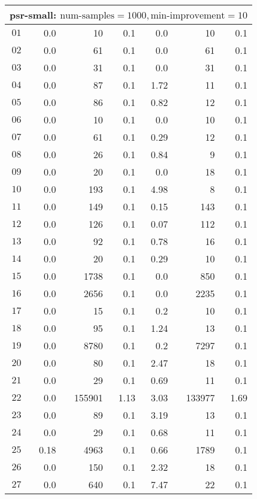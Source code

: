 \begin{longtable}{|c||r|r|r||r|r|r|}
\multicolumn{7}{|l|}{psr-small: $\text{num-samples}=1000,\text{min-improvement}=10$}\\\hline
$01$ & 0.0 & 10 & 0.1 &0.0 & 10 & 0.1 \\\hline
$02$ & 0.0 & 61 & 0.1 &0.0 & 61 & 0.1 \\\hline
$03$ & 0.0 & 31 & 0.1 &0.0 & 31 & 0.1 \\\hline
$04$ & 0.0 & 87 & 0.1 &1.72 & 11 & 0.1 \\\hline
$05$ & 0.0 & 86 & 0.1 &0.82 & 12 & 0.1 \\\hline
$06$ & 0.0 & 10 & 0.1 &0.0 & 10 & 0.1 \\\hline
$07$ & 0.0 & 61 & 0.1 &0.29 & 12 & 0.1 \\\hline
$08$ & 0.0 & 26 & 0.1 &0.84 & 9 & 0.1 \\\hline
$09$ & 0.0 & 20 & 0.1 &0.0 & 18 & 0.1 \\\hline
$10$ & 0.0 & 193 & 0.1 &4.98 & 8 & 0.1 \\\hline
$11$ & 0.0 & 149 & 0.1 &0.15 & 143 & 0.1 \\\hline
$12$ & 0.0 & 126 & 0.1 &0.07 & 112 & 0.1 \\\hline
$13$ & 0.0 & 92 & 0.1 &0.78 & 16 & 0.1 \\\hline
$14$ & 0.0 & 20 & 0.1 &0.29 & 10 & 0.1 \\\hline
$15$ & 0.0 & 1738 & 0.1 &0.0 & 850 & 0.1 \\\hline
$16$ & 0.0 & 2656 & 0.1 &0.0 & 2235 & 0.1 \\\hline
$17$ & 0.0 & 15 & 0.1 &0.2 & 10 & 0.1 \\\hline
$18$ & 0.0 & 95 & 0.1 &1.24 & 13 & 0.1 \\\hline
$19$ & 0.0 & 8780 & 0.1 &0.2 & 7297 & 0.1 \\\hline
$20$ & 0.0 & 80 & 0.1 &2.47 & 18 & 0.1 \\\hline
$21$ & 0.0 & 29 & 0.1 &0.69 & 11 & 0.1 \\\hline
$22$ & 0.0 & 155901 & 1.13 &3.03 & 133977 & 1.69 \\\hline
$23$ & 0.0 & 89 & 0.1 &3.19 & 13 & 0.1 \\\hline
$24$ & 0.0 & 29 & 0.1 &0.68 & 11 & 0.1 \\\hline
$25$ & 0.18 & 4963 & 0.1 &0.66 & 1789 & 0.1 \\\hline
$26$ & 0.0 & 150 & 0.1 &2.32 & 18 & 0.1 \\\hline
$27$ & 0.0 & 640 & 0.1 &7.47 & 22 & 0.1 \\\hline

\end{longtable}
